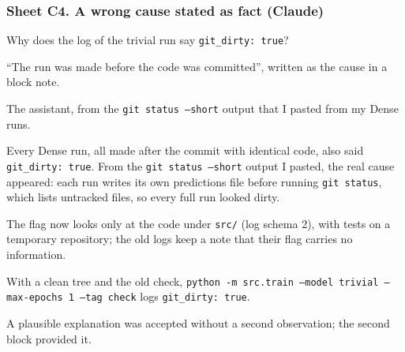 \subsubsection*{Sheet C4. A wrong cause stated as fact (Claude)}
\begin{description}[style=nextline,leftmargin=1.2em]
  \item[Prompt] Why does the log of the trivial run say \texttt{git\_dirty: true}?
  \item[Faulty response] ``The run was made before the code was committed'', written as the cause in a
        block note.
  \item[Detected by] The assistant, from the \texttt{git status --short} output that I pasted from my
        Dense runs.
  \item[Proof] Every Dense run, all made after the commit with identical code, also said
        \texttt{git\_dirty: true}. From the \texttt{git status --short} output I pasted, the real cause
        appeared: each run writes its own predictions file before running \texttt{git status}, which lists
        untracked files, so every full run looked dirty.
  \item[Correction] The flag now looks only at the code under \texttt{src/} (log schema 2), with tests on a
        temporary repository; the old logs keep a note that their flag carries no information.
  \item[Reproduction] With a clean tree and the old check, \texttt{python -m src.train --model trivial
        --max-epochs 1 --tag check} logs \texttt{git\_dirty: true}.
  \item[Reflection] A plausible explanation was accepted without a second observation; the second block
        provided it.
\end{description}

